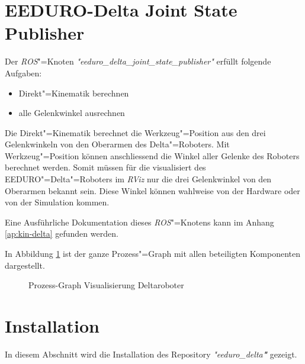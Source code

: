 \newpage

\section{EEDURO-Delta Joint State Publisher}
Der \textit{ROS}"=Knoten \textit{\textit{"}eeduro\_delta\_joint\_state\_publisher\textit{"}} erfüllt folgende Aufgaben:
\begin{itemize}
\item Direkt"=Kinematik berechnen
\item alle Gelenkwinkel ausrechnen
\end{itemize}
Die Direkt"=Kinematik berechnet die Werkzeug"=Position aus den drei Gelenkwinkeln von den Oberarmen des Delta"=Roboters.
Mit Werkzeug"=Position können anschliessend die Winkel aller Gelenke des Roboters berechnet werden.
Somit müssen für die visualisiert des EEDURO"=Delta"=Roboters im \textit{RViz} nur die drei Gelenkwinkel von den Oberarmen bekannt sein.
Diese Winkel können wahlweise von der Hardware oder von der Simulation kommen.

Eine Ausführliche Dokumentation dieses \textit{ROS}"=Knotens kann im Anhang \ref{ap:kin-delta} gefunden werden.

In Abbildung \ref{Ab:prozess} ist der ganze Prozess"=Graph mit allen beteiligten Komponenten dargestellt.

\begin{figure}[ht!]
	\centering
{}
	\caption{Prozess-Graph Visualisierung Deltaroboter}
	\label{Ab:prozess}
\end{figure}

\section{Installation}
In diesem Abschnitt wird die Installation des Repository \textit{\textit{"}eeduro\_delta\textbf{"}} gezeigt.

